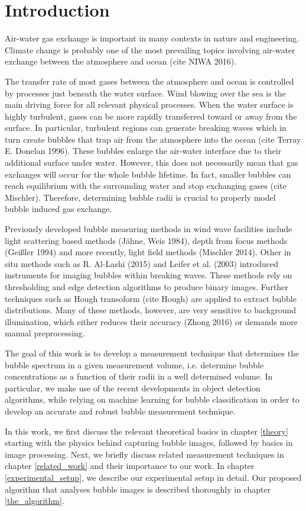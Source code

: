 \chapter{Introduction}
	Air-water gas exchange is important in many contexts in nature and engineering. Climate change is probably one of the most prevailing topics involving air-water exchange between the atmosphere and ocean (cite NIWA 2016). 
	
	The transfer rate of most gases between the atmosphere and ocean is controlled by processes just beneath the water surface. Wind blowing over the sea is the main driving force for all relevant physical processes. 
	When the water surface is highly turbulent, gases can be more rapidly transferred toward or away from the surface. In particular, turbulent regions can generate breaking waves which in turn create bubbles that trap air from the atmosphere into the ocean (cite Terray E. Donelan 1996). These bubbles enlarge the air-water interface due to their additional surface under water. However, this does not necessarily mean that gas exchanges will occur for the whole bubble lifetime. In fact, smaller bubbles can reach equilibrium with the surrounding water and stop exchanging gases (cite Mischler). Therefore, determining bubble radii is crucial to properly model bubble induced gas exchange.
	
	Previously developed bubble measuring methods in wind wave facilities include light scattering based methods (Jähne, Weis 1984), depth from focus methods (Geißler 1994) and more recently, light field methods (Mischler 2014). Other in situ methods such as R. Al-Lashi (2015) and Leifer et al. (2003) introduced instruments for imaging bubbles within breaking waves. These methods rely on thresholding and edge detection algorithms to produce binary images. Further techniques such as Hough transoform (cite Hough) are applied to extract bubble distributions. Many of these methods, however, are very sensitive to background illumination, which either reduces their accuracy (Zhong 2016) or demands more manual preprocessing.  
	
	The goal of this work is to develop a measurement technique that determines the bubble spectrum in a given measurement volume, i.e. determine bubble concentrations as a function of their radii in a well determined volume. In particular, we make use of the recent developments in object detection algorithms, while relying on machine learning for bubble classification in order to develop an accurate and robust bubble measurement technique. 
	
	In this work, we first discuss the relevant theoretical basics in chapter \ref{theory} starting with the physics behind capturing bubble images, followed by basics in image processing. Next, we briefly discuss related measurement techniques in chapter \ref{related_work} and their importance to our work. In chapter \ref{experimental_setup}, we describe our experimental setup in detail. Our proposed algorithm that analyses bubble images is described thoroughly in chapter \ref{the_algorithm}. 